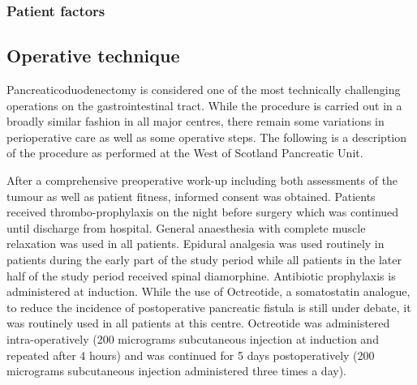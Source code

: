 \subsubsection{Patient factors}

\subsection{Operative technique}
Pancreaticoduodenectomy is considered one of the most technically challenging operations on the gastrointestinal tract. While the procedure is carried out in a broadly similar fashion in all major centres, there remain some variations in perioperative care as well as some operative steps. The following is a description of the procedure as performed at the West of Scotland Pancreatic Unit.

After a comprehensive preoperative work-up including both assessments of the tumour as well as patient fitness, informed consent was obtained. Patients received thrombo-prophylaxis on the night before surgery which was continued until discharge from hospital. General anaesthesia with complete muscle relaxation was used in all patients. Epidural analgesia was used routinely in patients during the early part of the study period while all patients in the later half of the study period received spinal diamorphine. Antibiotic prophylaxis is administered at induction. While the use of Octreotide, a somatostatin analogue, to reduce the incidence of postoperative pancreatic fistula is still under debate, it was routinely used in all patients at this centre. Octreotide was administered intra-operatively (200 micrograms subcutaneous injection at induction and repeated after 4 hours) and was continued for 5 days postoperatively (200 micrograms subcutaneous injection administered three times a day).

